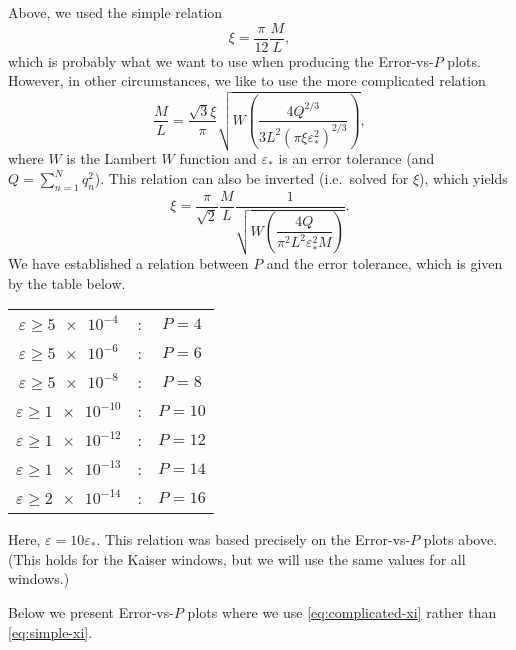 \documentclass[a4paper,10pt]{article}
\begin{document}
Above, we used the simple relation
\begin{equation}
  \label{eq:simple-xi}
  \xi = \frac{\pi}{12}\frac{M}{L},
\end{equation}
which is probably what we want to use when producing the
Error-vs-$P$ plots. However, in other circumstances, we like to
use the more complicated relation
\begin{equation}
  \label{eq:complicated-M}
  \frac{M}{L} = \frac{\sqrt{3}\xi}{\pi} \sqrt{W \left(
  \frac{4Q^{2/3}}{3L^2(\pi\xi\varepsilon_*^2)^{2/3}}
  \right)},
\end{equation}
where $W$ is the Lambert $W$ function and $\varepsilon_*$ is an
error tolerance (and $Q = \sum_{n=1}^N q_n^2$). This relation
can also be inverted (i.e.\ solved for $\xi$), which yields
\begin{equation}
  \label{eq:complicated-xi}
  \xi = \frac{\pi}{\sqrt{2}} \frac{M}{L}
  \frac{1}{\sqrt{W\left(\dfrac{4Q}{\pi^2 L^2 \varepsilon_*^2 M}\right)}}.
\end{equation}
We have established a relation between $P$ and the error
tolerance, which is given by the table below.
\begin{center}
  \begin{tabular}{ccc}
    \toprule
    $\varepsilon \geq \num{5e-4}$ &:& $P=4$ \\
    $\varepsilon \geq \num{5e-6}$ &:& $P=6$ \\
    $\varepsilon \geq \num{5e-8}$ &:& $P=8$ \\
    $\varepsilon \geq \num{1e-10}$ &:& $P=10$ \\
    $\varepsilon \geq \num{1e-12}$ &:& $P=12$ \\
    $\varepsilon \geq \num{1e-13}$ &:& $P=14$ \\
    $\varepsilon \geq \num{2e-14}$ &:& $P=16$ \\
    \bottomrule
  \end{tabular}
\end{center}
Here, $\varepsilon = 10 \varepsilon_*$. This relation was based
precisely on the Error-vs-$P$ plots above. (This holds for the
Kaiser windows, but we will use the same values for all windows.)

Below we present Error-vs-$P$ plots where we use
\eqref{eq:complicated-xi} rather than \eqref{eq:simple-xi}.
\end{document}
